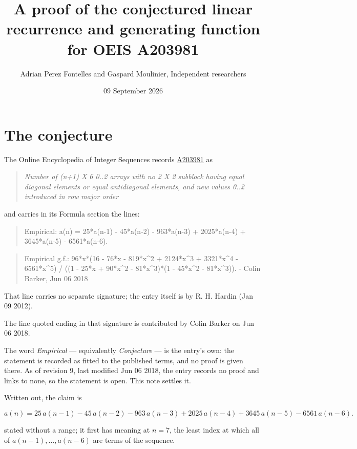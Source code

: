 \documentclass[11pt]{article}
\title{A proof of the conjectured linear recurrence and generating function for OEIS A203981}
\author{Adrian Perez Fontelles and Gaspard Moulinier, Independent researchers}
\date{09 September 2026}
\theoremstyle{definition}
\begin{document}
\maketitle
\section{The conjecture}

The Online Encyclopedia of Integer Sequences records \href{https://oeis.org/A203981}{A203981} as

\begin{quote}\itshape Number of (n+1) X 6 0..2 arrays with no 2 X 2 subblock having equal diagonal elements or equal antidiagonal elements, and new values 0..2 introduced in row major order\end{quote}

and carries in its Formula section the lines:

\begin{quote}\ttfamily Empirical: a(n) = 25*a(n-1) - 45*a(n-2) - 963*a(n-3) + 2025*a(n-4) + 3645*a(n-5) - 6561*a(n-6).\end{quote}

\begin{quote}\ttfamily Empirical g.f.: 96*x*(16 - 76*x - 819*x\textasciicircum{}2 + 2124*x\textasciicircum{}3 + 3321*x\textasciicircum{}4 - 6561*x\textasciicircum{}5) / ((1 - 25*x + 90*x\textasciicircum{}2 - 81*x\textasciicircum{}3)*(1 - 45*x\textasciicircum{}2 - 81*x\textasciicircum{}3)). - Colin Barker, Jun 06 2018\end{quote}

That line carries no separate signature; the entry itself is by R. H. Hardin (Jan 09 2012).

The line quoted ending in that signature is contributed by Colin Barker on Jun 06 2018.

The word {\itshape Empirical} --- equivalently {\itshape Conjecture} --- is the entry's own: the statement is recorded as fitted to the published terms, and no proof is given there. As of revision 9, last modified Jun 06 2018, the entry records no proof and links to none, so the statement is open. This note settles it.

Written out, the claim is

\[a(n) = 25\,a(n-1) - 45\,a(n-2) - 963\,a(n-3) + 2025\,a(n-4) + 3645\,a(n-5) - 6561\,a(n-6).\]

stated without a range; it first has meaning at $n = 7$, the least index at which all of $a(n-1),\dots,a(n-6)$ are terms of the sequence.
\end{document}
